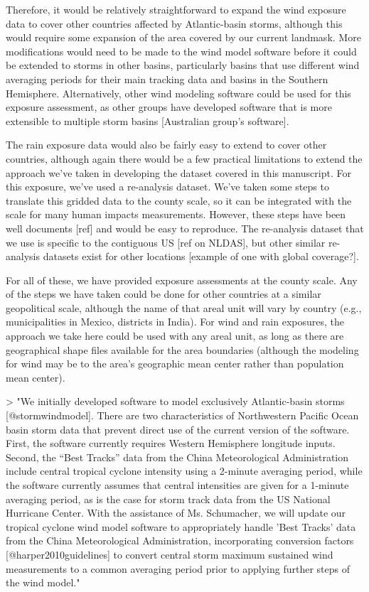 Therefore, it would be relatively straightforward to expand the wind exposure
data to cover other countries affected by Atlantic-basin storms, although this
would require some expansion of the area covered by our current landmask. More
modifications would need to be made to the wind model software before it could
be extended to storms in other basins, particularly basins that use different
wind averaging periods for their main tracking data and basins in the Southern
Hemisphere. Alternatively, other wind modeling software could be used for this
exposure assessment, as other groups have developed software that is more
extensible to multiple storm basins [Australian group's software].

The rain exposure data would also be fairly easy to extend to cover other
countries, although again there would be a few practical limitations to extend
the approach we've taken in developing the dataset covered in this manuscript.
For this exposure, we've used a re-analysis dataset. We've taken some steps to
translate this gridded data to the county scale, so it can be integrated with
the scale for many human impacts measurements. However, these steps have been
well documents [ref] and would be easy to reproduce. The re-analysis dataset
that we use is specific to the contiguous US [ref on NLDAS], but other similar
re-analysis datasets exist for other locations [example of one with global
coverage?].

For all of these, we have provided exposure assessments at the county scale. Any
of the steps we have taken could be done for other countries at a similar
geopolitical scale, although the name of that areal unit will vary by country
(e.g., municipalities in Mexico, districts in India). For wind and rain
exposures, the approach we take here could be used with any areal unit, as long
as there are geographical shape files available for the area boundaries
(although the modeling for wind may be to the area's geographic mean center
rather than population mean center).

> "We initially developed software to model exclusively Atlantic-basin storms
[@stormwindmodel]. There are two characteristics of Northwestern Pacific Ocean
basin storm data that prevent direct use of the current version of the software.
First, the software currently requires Western Hemisphere longitude inputs.
Second, the ``Best Tracks'' data from the China Meteorological Administration
include central tropical cyclone intensity using a 2-minute averaging period,
while the software currently assumes that central intensities are given for a
1-minute averaging period, as is the case for storm track data from the US
National Hurricane Center. With the assistance of Ms. Schumacher, we will update
our tropical cyclone wind model software to appropriately handle 'Best Tracks'
data from the China Meteorological Administration, incorporating conversion
factors [@harper2010guidelines] to convert central storm maximum sustained wind
measurements to a common averaging period prior to applying further steps of the
wind model."
